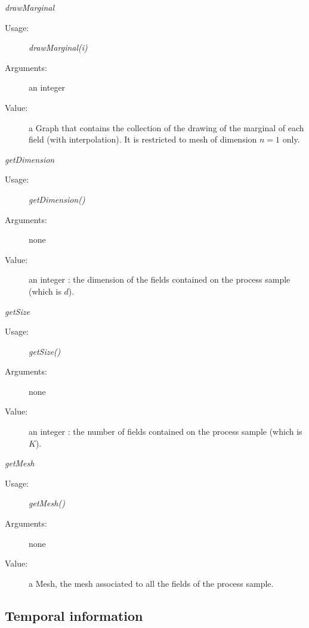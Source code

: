 \begin{description}
\begin{description}
\item \textit{drawMarginal}
\begin{description}
\item[Usage:] \textit{drawMarginal(i)}
\item[Arguments:] an integer
\item[Value:] a Graph that contains the collection of the drawing of the marginal of each field (with interpolation). It is restricted to mesh of dimension $n=1$ only.
\end{description}
\bigskip


\item \textit{getDimension}
\begin{description}
\item[Usage:] \textit{getDimension()}
\item[Arguments:] none
\item[Value:] an integer : the dimension of the fields contained on the process sample (which is $d$).
\end{description}
\bigskip

\item \textit{getSize}
\begin{description}
\item[Usage:] \textit{getSize()}
\item[Arguments:] none
\item[Value:] an integer : the number of fields contained on the process sample (which is $K$).
\end{description}
\bigskip

\item \textit{getMesh}
\begin{description}
\item[Usage:] \textit{getMesh()}
\item[Arguments:] none
\item[Value:] a Mesh, the mesh associated to all the fields of the process sample.
\end{description}

\end{description}

\end{description}





\newpage
\subsection{Temporal information}


